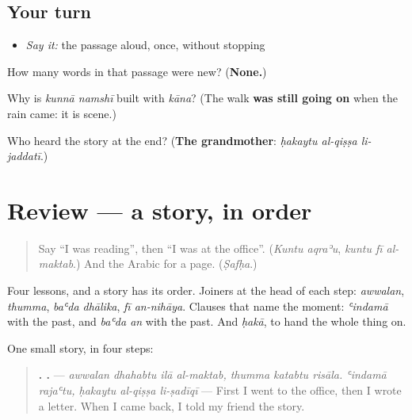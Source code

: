 \subsection*{Your turn}
\begin{itemize}
\raggedright
  \item \emph{Say it:} the passage aloud, once, without stopping
\end{itemize}

\begin{tcolorbox}[breakable,colback=teal!4,colframe=teal!35!black,title={Before you move on}]
How many words in that passage were new? (\textbf{None.})

Why is \emph{kunnā namshī} built with \emph{kāna}? (The walk \textbf{was still going on} when the rain came: it is scene.)

Who heard the story at the end? (\textbf{The grandmother}: \emph{ḥakaytu al-qiṣṣa li-jaddatī}.)
\end{tcolorbox}
\section[(review)]{Review — a story, in order}

\label{lesson:AR-R284-a-story-in-order}



\begin{quote}
Say \textquotedblleft{}I was reading\textquotedblright{}, then \textquotedblleft{}I was at the office\textquotedblright{}. (\emph{Kuntu aqraʾu}, \emph{kuntu fī al-maktab}.) And the Arabic for a page. (\emph{Ṣafḥa}.)
\end{quote}

\begin{grammarlens}[title={What you've built}]
Four lessons, and a story has its order. Joiners at the head of each step: \emph{awwalan}, \emph{thumma}, \emph{baʿda dhālika}, \emph{fī an-nihāya}. Clauses that name the moment: \emph{ʿindamā} with the past, and \emph{baʿda an} with the past. And \emph{ḥakā}, to hand the whole thing on.

One small story, in four steps:

\begin{quote}
\textbf{      .     .} — \emph{awwalan dhahabtu ilā al-maktab, thumma katabtu risāla. ʿindamā rajaʿtu, ḥakaytu al-qiṣṣa li-ṣadīqī} — First I went to the office, then I wrote a letter. When I came back, I told my friend the story.
\end{quote}
\end{grammarlens}

